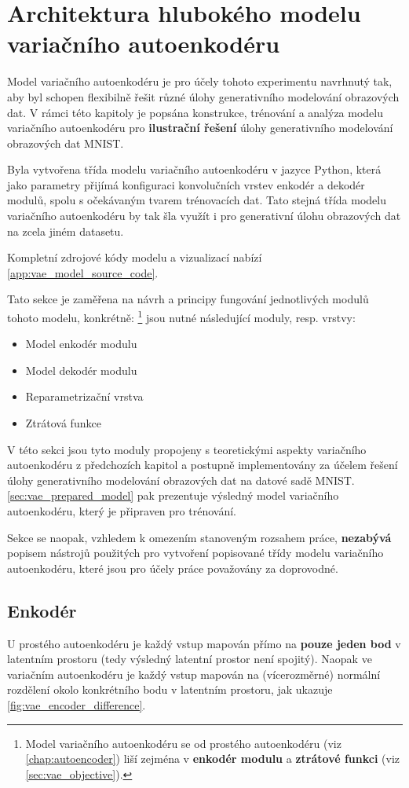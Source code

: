 \section{Architektura hlubokého modelu variačního autoenkodéru}
Model variačního autoenkodéru je pro účely tohoto experimentu navrhnutý tak, aby byl schopen flexibilně řešit různé úlohy generativního modelování obrazových dat.
V rámci této kapitoly je popsána konstrukce, trénování a analýza modelu variačního autoenkodéru pro \textbf{ilustrační řešení} úlohy generativního modelování obrazových dat MNIST.

Byla vytvořena třída modelu variačního autoenkodéru v jazyce Python, která jako parametry přijímá konfiguraci konvolučních vrstev enkodér a dekodér modulů, spolu s očekávaným tvarem trénovacích dat.
Tato stejná třída modelu variačního autoenkodéru by tak šla využít i pro generativní úlohu obrazových dat na zcela jiném datasetu.

Kompletní zdrojové kódy modelu a vizualizací nabízí \autoref{app:vae_model_source_code}.

Tato sekce je zaměřena na návrh a principy fungování jednotlivých modulů tohoto modelu, konkrétně:
\footnote{Model variačního autoenkodéru se od prostého autoenkodéru (viz \autoref{chap:autoencoder}) liší zejména v \textbf{enkodér modulu} a \textbf{ztrátové funkci} (viz \autoref{sec:vae_objective}).} jsou nutné následující moduly, resp. vrstvy:
\begin{itemize}
    \item Model enkodér modulu
    \item Model dekodér modulu
    \item Reparametrizační vrstva
    \item Ztrátová funkce
\end{itemize}

V této sekci jsou tyto moduly propojeny s teoretickými aspekty variačního autoenkodéru z předchozích kapitol a postupně implementovány za účelem řešení úlohy generativního modelování obrazových dat na datové sadě MNIST.
\autoref{sec:vae_prepared_model} pak prezentuje výsledný model variačního autoenkodéru, který je připraven pro trénování.

Sekce se naopak, vzhledem k omezením stanoveným rozsahem práce, \textbf{nezabývá} popisem nástrojů použitých pro vytvoření popisované třídy modelu variačního autoenkodéru, které jsou pro účely práce považovány za doprovodné.

\subsection{Enkodér}
\label{sec:vae_model_encoder}
U prostého autoenkodéru je každý vstup mapován přímo na \textbf{pouze jeden bod} v latentním prostoru (tedy výsledný latentní prostor není spojitý).
Naopak ve variačním autoenkodéru je každý vstup mapován na (vícerozměrné) normální rozdělení okolo konkrétního bodu v latentním prostoru, jak ukazuje \autoref{fig:vae_encoder_difference}.

